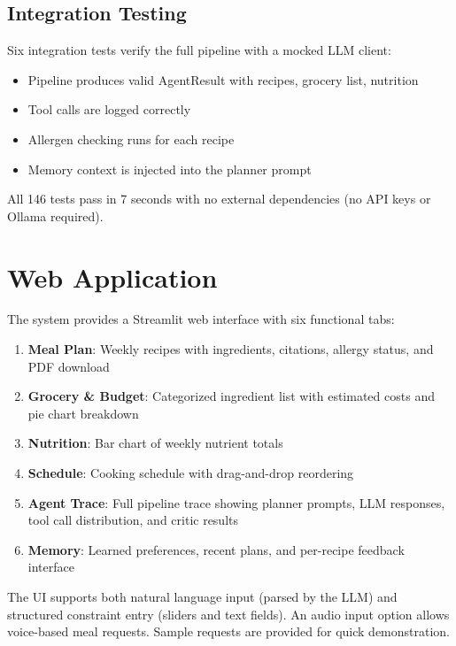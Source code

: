 \documentclass[11pt,twocolumn]{article}
\begin{document}
\subsection{Integration Testing}

Six integration tests verify the full pipeline with a mocked LLM client:
\begin{itemize}[nosep]
    \item Pipeline produces valid AgentResult with recipes, grocery list, nutrition
    \item Tool calls are logged correctly
    \item Allergen checking runs for each recipe
    \item Memory context is injected into the planner prompt
\end{itemize}

All 146 tests pass in 7 seconds with no external dependencies (no API keys or Ollama required).

\section{Web Application}

The system provides a Streamlit web interface with six functional tabs:

\begin{enumerate}[nosep]
    \item \textbf{Meal Plan}: Weekly recipes with ingredients, citations, allergy status, and PDF download
    \item \textbf{Grocery \& Budget}: Categorized ingredient list with estimated costs and pie chart breakdown
    \item \textbf{Nutrition}: Bar chart of weekly nutrient totals
    \item \textbf{Schedule}: Cooking schedule with drag-and-drop reordering
    \item \textbf{Agent Trace}: Full pipeline trace showing planner prompts, LLM responses, tool call distribution, and critic results
    \item \textbf{Memory}: Learned preferences, recent plans, and per-recipe feedback interface
\end{enumerate}

The UI supports both natural language input (parsed by the LLM) and structured constraint entry (sliders and text fields). An audio input option allows voice-based meal requests. Sample requests are provided for quick demonstration.
\end{document}
